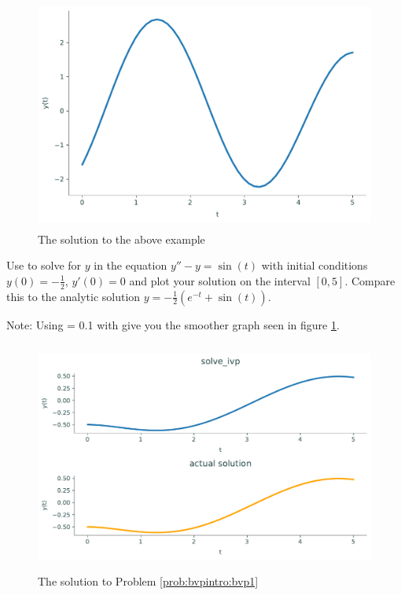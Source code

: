 \begin{figure}[H]
    \centering
    \includegraphics[height=3in]{figures/fig1.pdf}
    \caption{The solution to the above example}
\end{figure}

\begin{problem}
\label{prob:bvpintro:bvp1}
Use  to solve for $y$ in the equation $y'' - y = \sin(t)$ with initial conditions $y(0)= -\frac{1}{2}$, $y'(0) = 0$ and plot your solution on the interval $[0,5]$.
Compare this to the analytic solution $y=-\frac{1}{2}(e^{-t}+\sin(t))$.

    Note: Using  = 0.1 with give you the smoother graph seen in figure \ref{fig:bvpintro:bvp1}.
\end{problem}

\begin{figure}[H]
    \centering
    \includegraphics[height=3in]{figures/problem1.pdf}
    \caption{The solution to Problem \ref{prob:bvpintro:bvp1}}
    \label{fig:bvpintro:bvp1}
\end{figure}

